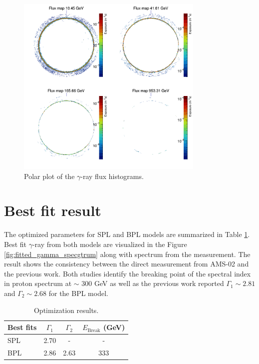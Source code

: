 \begin{figure}[h!]
    \centering
    \includegraphics[width=0.8\textwidth]{content/result_and_discussion/figures/polar_flxmaps.png}
    \caption{Polar plot of the $\gamma$-ray flux histograms.}
    \label{fig:flxmap_polar}
\end{figure}

\newpage

\section{Best fit result}

The optimized parameters for SPL and BPL models are summarized in 
Table \ref{tb:bestfit}. Best fit $\gamma$-ray from both models are 
visualized in the Figure \ref{fig:fitted_gamma_specgtrum} along
with spectrum from the measurement. The result shows the consistency
between the direct measurement from AMS-02 and
the previous work. Both studies identify the breaking point 
of the spectral index in proton spectrum at $\sim$ 300 GeV as well 
as the previous work reported $\Gamma_1 \sim 2.81$
and $\Gamma_2 \sim 2.68$ for the BPL model.

\begin{table}[h!]
    \centering
    \begin{tabular}{l | c | c | c}
      Best fits & $\Gamma_1$ & $\Gamma_2$ & $E_{\text{Break}}$ (GeV) \\
      \hline \hline
      SPL & 2.70 & - & -  \\
      BPL & 2.86  & 2.63 & 333
    \end{tabular}
    \caption{Optimization results.}
    \label{tb:bestfit}
\end{table}

